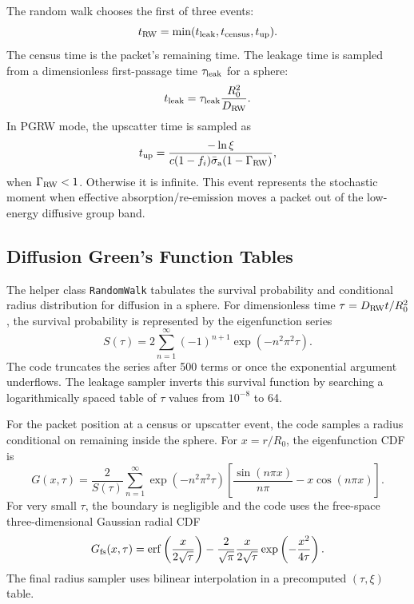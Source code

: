 \documentclass[11pt]{article}
\begin{document}
The random walk chooses the first of three events:
\begin{equation}
  t_{\rm RW}
  =
  \min(t_{\rm leak},t_{\rm census},t_{\rm up}).
\end{equation}
The census time is the packet's remaining time. The leakage time is sampled
from a dimensionless first-passage time \(\tau_{\rm leak}\) for a sphere:
\begin{equation}
  t_{\rm leak}
  =
  \tau_{\rm leak}\frac{R_0^2}{D_{\rm RW}}.
\end{equation}
In PGRW mode, the upscatter time is sampled as
\begin{equation}
  t_{\rm up}
  =
  \frac{-\ln \xi}
       {c(1-f_i)\bar{\sigma}_{\rm a}(1-\Gamma_{\rm RW})},
  \label{eq:upscatter-time}
\end{equation}
when \(\Gamma_{\rm RW}<1\). Otherwise it is infinite. This event represents
the stochastic moment when effective absorption/re-emission moves a packet out
of the low-energy diffusive group band.

\subsection{Diffusion Green's Function Tables}

The helper class \texttt{RandomWalk} tabulates the survival probability and
conditional radius distribution for diffusion in a sphere. For dimensionless
time \(\tau=D_{\rm RW}t/R_0^2\), the survival probability is represented by the
eigenfunction series
\begin{equation}
  S(\tau)
  =
  2\sum_{n=1}^{\infty}
  (-1)^{n+1}\exp(-n^2\pi^2\tau).
  \label{eq:rw-survival}
\end{equation}
The code truncates the series after 500 terms or once the exponential argument
underflows. The leakage sampler inverts this survival function by searching a
logarithmically spaced table of \(\tau\) values from \(10^{-8}\) to 64.

For the packet position at a census or upscatter event, the code samples a
radius conditional on remaining inside the sphere. For \(x=r/R_0\), the
eigenfunction CDF is
\begin{equation}
  G(x,\tau)
  =
  \frac{2}{S(\tau)}
  \sum_{n=1}^{\infty}
  \exp(-n^2\pi^2\tau)
  \left[
    \frac{\sin(n\pi x)}{n\pi}
    -
    x\cos(n\pi x)
  \right].
  \label{eq:rw-radius-cdf}
\end{equation}
For very small \(\tau\), the boundary is negligible and the code uses the
free-space three-dimensional Gaussian radial CDF
\begin{equation}
  G_{\rm fs}(x,\tau)
  =
  \operatorname{erf}\left(\frac{x}{2\sqrt{\tau}}\right)
  -
  \frac{2}{\sqrt{\pi}}
  \frac{x}{2\sqrt{\tau}}
  \exp\left(-\frac{x^2}{4\tau}\right).
  \label{eq:free-space-radius}
\end{equation}
The final radius sampler uses bilinear interpolation in a precomputed
\((\tau,\xi)\) table.
\end{document}
